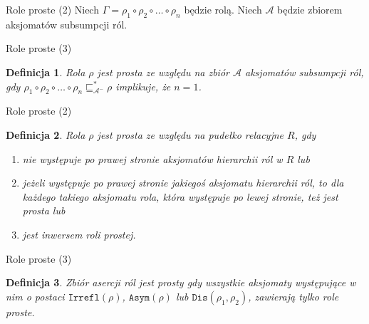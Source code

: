 \documentclass{beamer}
\newtheorem{definicja}{Definicja}
\begin{document}
\begin{frame}{Role proste (2)}
%
Niech $\Gamma = \rho_{1} \circ \rho_{2} \circ \dots \circ \rho_{n}$ będzie rolą. %
%
Niech $\mathcal{A}$ będzie zbiorem aksjomatów subsumpcji ról. %
\end{frame}

\begin{frame}{Role proste (3)}
%
\begin{definicja}
Rola $\rho$ jest prosta ze względu na zbiór  $\mathcal{A}$ aksjomatów subsumpcji ról, gdy $\rho_{1} \circ \rho_{2} \circ \dots \circ \rho_{n} \sqsubseteq_{\mathcal{A}^{-}}^{*} \rho$ implikuje, że $n=1$.
\end{definicja}
\end{frame}

\begin{frame}{Role proste (2)}
%
\begin{definicja}
Rola $\rho$ jest \emph{prosta} ze względu na pudełko relacyjne $R$, gdy
\begin{enumerate}
	\item nie występuje po prawej stronie aksjomatów hierarchii ról w $R$ lub
	\item jeżeli występuje po prawej stronie jakiegoś aksjomatu hierarchii ról, to dla każdego takiego aksjomatu rola, która występuje po lewej stronie, też jest prosta lub
	\item jest inwersem roli prostej.
\end{enumerate}
\end{definicja}
\end{frame}

\begin{frame}{Role proste (3)}
%
\begin{definicja}
Zbiór asercji ról jest prosty gdy wszystkie aksjomaty występujące w nim o postaci $\texttt{Irrefl}(\rho)$, $\texttt{Asym}(\rho)$ lub $\texttt{Dis}(\rho_{1}, \rho_{2})$, zawierają tylko role proste.
\end{definicja}
\end{frame}
\end{document}
